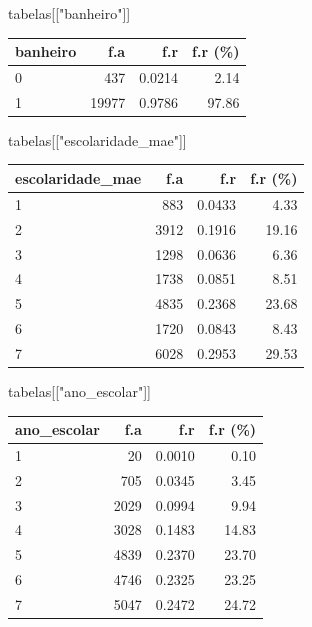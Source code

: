 \documentclass[
]{article}
\newenvironment{Shaded}{\begin{snugshade}}{\end{snugshade}}
\newcommand{\NormalTok}[1]{\textcolor[rgb]{0.00,0.23,0.31}{#1}}
\newcommand{\StringTok}[1]{\textcolor[rgb]{0.13,0.47,0.30}{#1}}
\begin{document}
\begin{Shaded}
\begin{Highlighting}[]
\NormalTok{tabelas[[}\StringTok{"banheiro"}\NormalTok{]]}
\end{Highlighting}
\end{Shaded}

\begin{longtable}[]{@{}lrrr@{}}
\toprule()
banheiro & f.a & f.r & f.r (\%) \\
\midrule()
\endhead
0 & 437 & 0.0214 & 2.14 \\
1 & 19977 & 0.9786 & 97.86 \\
\bottomrule()
\end{longtable}

\begin{Shaded}
\begin{Highlighting}[]
\NormalTok{tabelas[[}\StringTok{"escolaridade\_mae"}\NormalTok{]]}
\end{Highlighting}
\end{Shaded}

\begin{longtable}[]{@{}lrrr@{}}
\toprule()
escolaridade\_mae & f.a & f.r & f.r (\%) \\
\midrule()
\endhead
1 & 883 & 0.0433 & 4.33 \\
2 & 3912 & 0.1916 & 19.16 \\
3 & 1298 & 0.0636 & 6.36 \\
4 & 1738 & 0.0851 & 8.51 \\
5 & 4835 & 0.2368 & 23.68 \\
6 & 1720 & 0.0843 & 8.43 \\
7 & 6028 & 0.2953 & 29.53 \\
\bottomrule()
\end{longtable}

\begin{Shaded}
\begin{Highlighting}[]
\NormalTok{tabelas[[}\StringTok{"ano\_escolar"}\NormalTok{]]}
\end{Highlighting}
\end{Shaded}

\begin{longtable}[]{@{}lrrr@{}}
\toprule()
ano\_escolar & f.a & f.r & f.r (\%) \\
\midrule()
\endhead
1 & 20 & 0.0010 & 0.10 \\
2 & 705 & 0.0345 & 3.45 \\
3 & 2029 & 0.0994 & 9.94 \\
4 & 3028 & 0.1483 & 14.83 \\
5 & 4839 & 0.2370 & 23.70 \\
6 & 4746 & 0.2325 & 23.25 \\
7 & 5047 & 0.2472 & 24.72 \\
\bottomrule()
\end{longtable}
\end{document}
